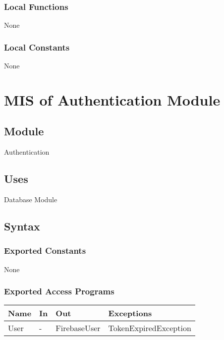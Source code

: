 \documentclass[12pt, titlepage]{article}
\begin{document}
\subsubsection{Local Functions}

None

\subsubsection{Local Constants}

None

\newpage

\section{MIS of Authentication Module} \label{mAuth}

\subsection{Module}

Authentication

\subsection{Uses}

Database Module

\subsection{Syntax}

\subsubsection{Exported Constants}

None

\subsubsection{Exported Access Programs}

\begin{center}
	\begin{tabular}{p{4cm} p{2cm} p{4cm} p{4cm}}
	\hline
	\textbf{Name} & \textbf{In} & \textbf{Out} & \textbf{Exceptions} \\
	\hline
	User & - & FirebaseUser & TokenExpiredException \\
	\hline
	\end{tabular}
\end{center}
\end{document}

